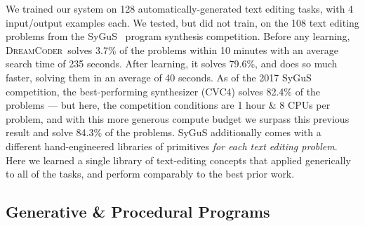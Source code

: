 \documentclass{article}
\newcommand{\system}{\textsc{DreamCoder}~}
\newcommand{\code}[1]{{\footnotesize\texttt{#1}}}
\newcommand{\probability}{\mathds{P}} %
\begin{document}

We trained our system on 128 automatically-generated text editing tasks, with 4 input/output examples each.
We tested, but did not train, on the 108 text editing problems from the SyGuS~\cite{alur2016sygus} program synthesis competition. Before any learning,
\system solves 3.7\% of the problems within 10 minutes with an average search time of 235 seconds.
After learning,
it solves 79.6\%, and does so much faster,
solving them in an average of 40 seconds.
As of the 2017 SyGuS competition,
the best-performing synthesizer (CVC4) solves 82.4\% of the problems ---
but here, the competition conditions are 1 hour \& 8 CPUs per problem,
and with this more generous compute budget we
surpass
this previous
result and solve
84.3\% of the problems.
SyGuS additionally comes with a
different hand-engineered libraries of primitives \emph{for each text editing problem}. %
Here  we learned a single library of text-editing concepts
that applied generically to
all of the tasks,
and perform comparably to the best
prior work.


\subsection{Generative \& Procedural Programs}
\end{document}
